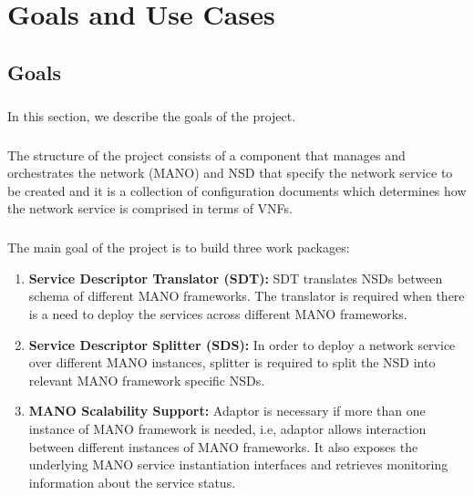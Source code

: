\chapter{Goals and Use Cases}
\label{ch:Goals and Use Cases}


\section{Goals}
\paragraph{}
In this section, we describe the goals of the project.


\paragraph{}
The structure of the project consists of a component that manages and orchestrates the network (MANO) and NSD that specify the network service to be created and it is a collection of configuration documents which determines how the network service is comprised in terms of VNFs.


\paragraph{}
The main goal of the project is to build three work packages:

\begin{enumerate}
	\item \textbf{Service Descriptor Translator (SDT):} SDT translates NSDs between schema of different MANO frameworks. The translator is required when there is a need to deploy the services across different MANO frameworks.
	
	\item \textbf{Service Descriptor Splitter (SDS):} In order to deploy a network service over different MANO instances, splitter is required to split the NSD into relevant MANO framework specific NSDs.
	
	
	\item \textbf{MANO Scalability Support:} Adaptor is necessary if more than one instance of MANO framework is needed, i.e,  adaptor allows interaction between different instances of MANO frameworks. It also exposes the underlying MANO service instantiation interfaces and retrieves monitoring information about the service status.
\end{enumerate}

